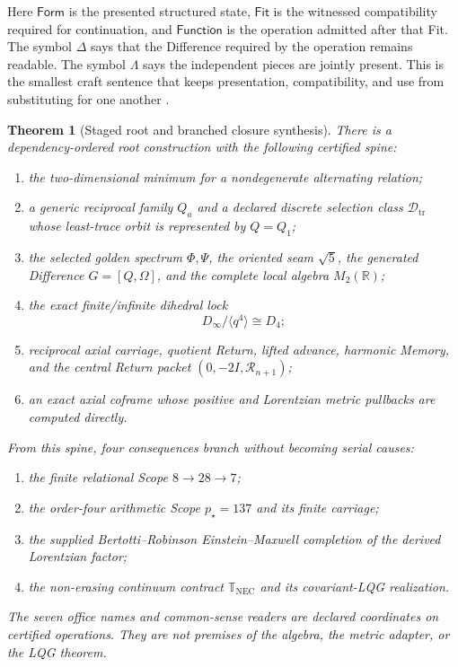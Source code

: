 \documentclass[11pt]{article}
\newtheorem{theorem}{Theorem}[section]
\newcommand{\R}{\mathbb R}
\newcommand{\LMForm}{\mathsf{Form}}
\newcommand{\LMFit}{\mathsf{Fit}}
\newcommand{\LMFunction}{\mathsf{Function}}
\newcommand{\NEC}{\mathbb T_{\mathrm{NEC}}}
\newcommand{\Dtr}{\mathcal D_{\mathrm{tr}}}
\begin{document}
Here $\LMForm$ is the presented structured state, $\LMFit$ is the witnessed compatibility required for continuation, and $\LMFunction$ is the operation admitted after that Fit. The symbol $\Delta$ says that the Difference required by the operation remains readable. The symbol $\Lambda$ says the independent pieces are jointly present. This is the smallest craft sentence that keeps presentation, compatibility, and use from substituting for one another \cite{CoppaFormFit2026,CoppaMethodKernel2026}.

\begin{theorem}[Staged root and branched closure synthesis]
There is a dependency-ordered root construction with the following certified spine:
\begin{enumerate}[label=(\roman*)]
\item the two-dimensional minimum for a nondegenerate alternating relation;
\item a generic reciprocal family $Q_a$ and a declared discrete selection class $\Dtr$ whose least-trace orbit is represented by $Q=Q_1$;
\item the selected golden spectrum $\Phi,\Psi$, the oriented seam $\sqrt5$, the generated Difference $G=[Q,\Omega]$, and the complete local algebra $M_2(\R)$;
\item the exact finite/infinite dihedral lock
\[
D_\infty/\langle q^4\rangle\cong D_4;
\]
\item reciprocal axial carriage, quotient Return, lifted advance, harmonic Memory, and the central Return packet $(0,-2I,\mathcal R_{n+1})$;
\item an exact axial coframe whose positive and Lorentzian metric pullbacks are computed directly.
\end{enumerate}
From this spine, four consequences branch without becoming serial causes:
\begin{enumerate}[label=(\alph*)]
\item the finite relational Scope $8\to28\to7$;
\item the order-four arithmetic Scope $p_\star=137$ and its finite carriage;
\item the supplied Bertotti--Robinson Einstein--Maxwell completion of the derived Lorentzian factor;
\item the non-erasing continuum contract $\NEC$ and its covariant-LQG realization.
\end{enumerate}
The seven office names and common-sense readers are declared coordinates on certified operations. They are not premises of the algebra, the metric adapter, or the LQG theorem.
\end{theorem}
\end{document}
